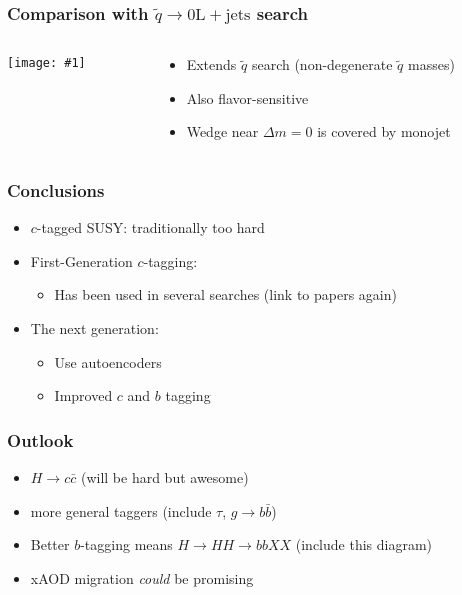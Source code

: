 \documentclass[usenames,dvipsnames]{beamer}
\newcommand{\widegraphic}[1]{\texttt{[image: \#1]}}
\begin{document}
\begin{frame}
  \frametitle{Comparison with $\tilde{q} \to \mathrm{0L} + \text{jets}$ search}
  \begin{columns}
    \begin{column}{0.6\textwidth}
      \widegraphic{int/figures/limit_tree/full_exclusion/exclusion_inclusive.pdf}
    \end{column}
    \begin{column}{0.4\textwidth}
      \begin{itemize}
      \item Extends $\tilde{q}$ search (non-degenerate $\tilde{q}$ masses)
      \item Also flavor-sensitive
      \item Wedge near $\Delta m = 0$ is covered by monojet
      \end{itemize}
    \end{column}
  \end{columns}
\end{frame}

\begin{frame}
  \frametitle{Conclusions}
  \begin{itemize}
  \item $c$-tagged SUSY: traditionally too hard
  \item First-Generation $c$-tagging:
    \begin{itemize}
    \item Has been used in several searches (link to papers again)
    \end{itemize}
  \item The next generation:
    \begin{itemize}
    \item Use autoencoders
    \item Improved $c$ and $b$ tagging
    \end{itemize}
  \end{itemize}
\end{frame}

\begin{frame}
  \frametitle{Outlook}
  \begin{itemize}
  \item $H \to c \bar{c}$ (will be hard but awesome)
  \item more general taggers (include $\tau$, $g \to b \bar{b}$)
  \item Better $b$-tagging means $H \to HH \to bbXX$ (include this diagram)
  \item xAOD migration \emph{could} be promising
  \end{itemize}
\end{frame}
\end{document}
